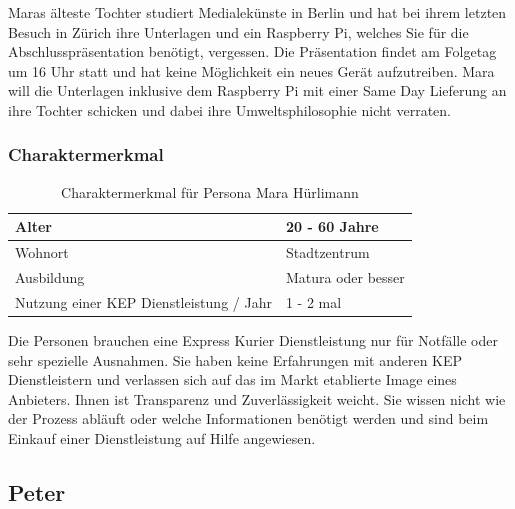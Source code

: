 Maras älteste Tochter studiert Medialekünste in Berlin und hat bei ihrem letzten Besuch in Zürich ihre Unterlagen und ein Raspberry Pi, welches Sie für die Abschlusspräsentation benötigt, vergessen. Die Präsentation findet am Folgetag um 16 Uhr statt und hat keine Möglichkeit ein neues Gerät aufzutreiben. Mara will die Unterlagen inklusive dem Raspberry Pi mit einer Same Day Lieferung an ihre Tochter schicken und dabei ihre Umweltsphilosophie nicht verraten.

\subsubsection{Charaktermerkmal}
\begin{table}[]
\centering

\label{my-label}
\begin{tabular}{|l|l|}
\hline
Alter                                   & 20 - 60 Jahre        \\ \hline
Wohnort                                 & Stadtzentrum         \\ \hline
Ausbildung                              & Matura oder besser \\ \hline
Nutzung einer KEP Dienstleistung / Jahr & 1 - 2 mal            \\ \hline
\end{tabular}
\caption{Charaktermerkmal für Persona Mara Hürlimann}
\end{table}

Die Personen brauchen eine Express Kurier Dienstleistung nur für Notfälle oder sehr spezielle Ausnahmen. Sie haben keine Erfahrungen mit anderen KEP Dienstleistern und verlassen sich auf das im Markt etablierte Image eines Anbieters. Ihnen ist Transparenz und Zuverlässigkeit weicht. Sie wissen nicht wie der Prozess abläuft oder welche Informationen benötigt werden und sind beim Einkauf einer Dienstleistung auf Hilfe angewiesen.



\subsection{Peter}

